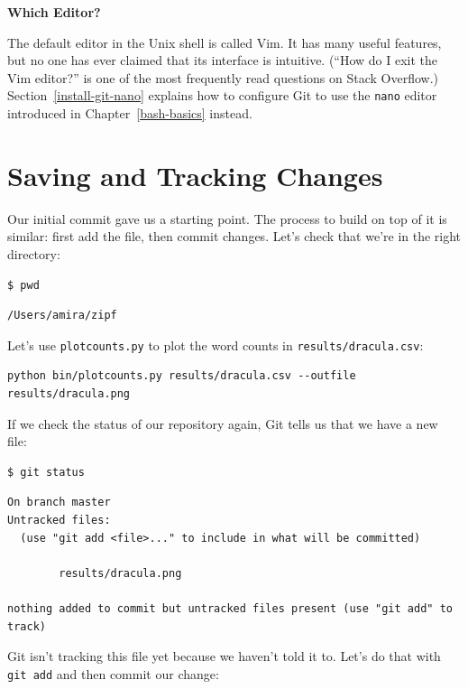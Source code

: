 \documentclass[
]{krantz}
\renewenvironment{quote}{\begin{VF}}{\end{VF}}
\begin{document}
\begin{quote}
\textbf{Which Editor?}

The default editor in the Unix shell is called Vim.
It has many useful features,
but no one has ever claimed that its interface is intuitive.
(``How do I exit the Vim editor?''
is one of the most frequently read questions on Stack Overflow.)
Section~\ref{install-git-nano} explains
how to configure Git to use the \texttt{nano} editor
introduced in Chapter~\ref{bash-basics} instead.
\end{quote}

\hypertarget{git-cmdline-changes}{%
\section{Saving and Tracking Changes}\label{git-cmdline-changes}}

Our initial commit gave us a starting point.
The process to build on top of it is similar:
first add the file, then commit changes.
Let's check that we're in the right directory:

\begin{verbatim}
$ pwd
\end{verbatim}

\begin{verbatim}
/Users/amira/zipf
\end{verbatim}

Let's use \texttt{plotcounts.py} to plot the word counts in \texttt{results/dracula.csv}:

\begin{verbatim}
python bin/plotcounts.py results/dracula.csv --outfile results/dracula.png
\end{verbatim}

If we check the status of our repository again,
Git tells us that we have a new file:

\begin{verbatim}
$ git status
\end{verbatim}

\begin{verbatim}
On branch master
Untracked files:
  (use "git add <file>..." to include in what will be committed)

        results/dracula.png

nothing added to commit but untracked files present (use "git add" to track)
\end{verbatim}

Git isn't tracking this file yet because we haven't told it to.
Let's do that with \texttt{git\ add} and then commit our change:
\end{document}
